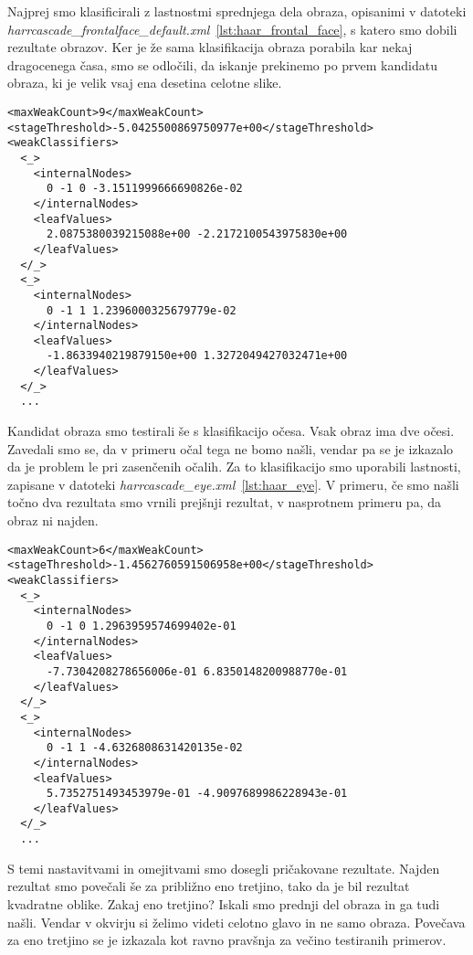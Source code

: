 Najprej smo klasificirali z lastnostmi sprednjega dela obraza, opisanimi v datoteki
\textit{harrcascade\_frontalface\_default.xml}~\ref{lst:haar_frontal_face}, s
katero smo dobili rezultate obrazov. Ker je že sama klasifikacija obraza
porabila kar nekaj dragocenega časa, smo se odločili, da iskanje prekinemo po
prvem kandidatu obraza, ki je velik vsaj ena desetina celotne slike.

\begin{lstlisting}[label=lst:haar_frontal_face, caption=Izsek iz datoteke harrcascade\_frontalface\_default.xml]
<maxWeakCount>9</maxWeakCount>
<stageThreshold>-5.0425500869750977e+00</stageThreshold>
<weakClassifiers>
  <_>
    <internalNodes>
      0 -1 0 -3.1511999666690826e-02
    </internalNodes>
    <leafValues>
      2.0875380039215088e+00 -2.2172100543975830e+00
    </leafValues>
  </_>
  <_>
    <internalNodes>
      0 -1 1 1.2396000325679779e-02
    </internalNodes>
    <leafValues>
      -1.8633940219879150e+00 1.3272049427032471e+00
    </leafValues>
  </_>
  ...
\end{lstlisting}

Kandidat obraza smo testirali še s klasifikacijo očesa. Vsak obraz ima dve
očesi. Zavedali smo se, da v primeru očal tega ne bomo našli, vendar pa se je
izkazalo da je problem le pri zasenčenih očalih. Za to klasifikacijo smo
uporabili lastnosti, zapisane v datoteki
\textit{harrcascade\_eye.xml}~\ref{lst:haar_eye}. V primeru, če smo
našli točno dva rezultata smo vrnili prejšnji rezultat, v nasprotnem primeru
pa, da obraz ni najden.

\begin{lstlisting}[label=lst:haar_eye, caption=Izsek iz datoteke harrcascade\_eye.xml]
<maxWeakCount>6</maxWeakCount>
<stageThreshold>-1.4562760591506958e+00</stageThreshold>
<weakClassifiers>
  <_>
    <internalNodes>
      0 -1 0 1.2963959574699402e-01
    </internalNodes>
    <leafValues>
      -7.7304208278656006e-01 6.8350148200988770e-01
    </leafValues>
  </_>
  <_>
    <internalNodes>
      0 -1 1 -4.6326808631420135e-02
    </internalNodes>
    <leafValues>
      5.7352751493453979e-01 -4.9097689986228943e-01
    </leafValues>
  </_>
  ...
\end{lstlisting}

S temi nastavitvami in omejitvami smo dosegli pričakovane rezultate. Najden
rezultat smo povečali še za približno eno tretjino, tako da je bil rezultat
kvadratne oblike. Zakaj eno tretjino? Iskali smo prednji del obraza in ga tudi
našli. Vendar v okvirju si želimo videti celotno glavo in ne samo obraza.
Povečava za eno tretjino se je izkazala kot ravno pravšnja za večino
testiranih primerov.

